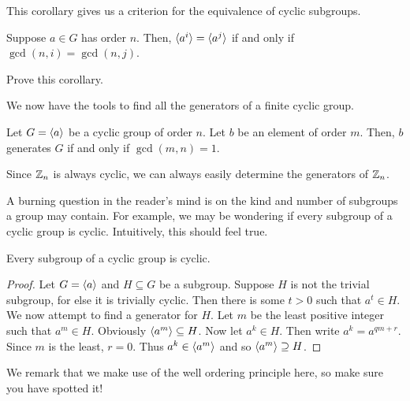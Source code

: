 \documentclass[./main.tex]{subfiles}
\begin{document}
This corollary gives us a criterion for the equivalence of cyclic subgroups.
\begin{corollary}
    Suppose $a \in G$ has order $n$. Then, ${ \langle a^i \rangle } = { \langle a^j \rangle }$ if and only
    if $\gcd(n,i) = \gcd(n,j)$. 
\end{corollary}
\begin{exercise}
    Prove this corollary.
\end{exercise}

We now have the tools to find all the generators of a finite cyclic group.
\begin{corollary}
\label{cor:generator-of-group-criteria}
    Let $G = { \langle a \rangle }$ be a cyclic group of order $n$. Let $b$ be an element of
    order $m$. Then, $b$ generates $G$ if and only if $\gcd(m, n) = 1$.
\end{corollary}
Since $\mathbb{Z}_n$ is always cyclic, we can always easily determine the generators of $\mathbb{Z}_n$.

A burning question in the reader's mind is on the kind and number of subgroups a
group may contain. For example, we may be wondering if every subgroup of a
cyclic group is cyclic. Intuitively, this should feel true. 
\begin{theorem}
\label{thm:subgroups-of-cyclic-group-are-cyclic}
    Every subgroup of a cyclic group is cyclic. 
\end{theorem}
\begin{proof}
    Let $G = { \langle a \rangle }$ and $H \subseteq G$ be a subgroup. Suppose $H$ is not the
    trivial subgroup, for else it is trivially cyclic. Then there is some $t >
    0$ such that $a^t \in H$. We now attempt to find a generator for $H$. Let
    $m$ be the least positive integer such that $a^m \in H$. Obviously
    ${ \langle a^m \rangle } \subseteq H$. Now let $a^k \in H$. Then write $a^k = a^{qm + r}$.
    Since $m$ is the least, $r = 0$. Thus $a^k \in { \langle a^m \rangle }$ and so ${ \langle a^m \rangle }
    \supseteq H$.
\end{proof}
We remark that we make use of the well ordering principle here, so make sure you
have spotted it!
\end{document}
